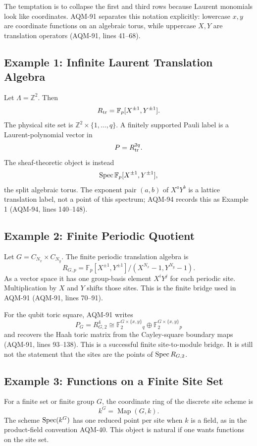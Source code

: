 The temptation is to collapse the first and third rows because Laurent
monomials look like coordinates.  AQM-91 separates this notation explicitly:
lowercase \(x,y\) are coordinate functions on an algebraic torus, while
uppercase \(X,Y\) are translation operators (AQM-91, lines 41--68).

\subsection{Example 1: Infinite Laurent Translation Algebra}

Let \(\Lambda=\mathbb Z^2\).  Then
\[
  R_{\rm tr}=\mathbb F_p[X^{\pm1},Y^{\pm1}].
\]
The physical site set is \(\mathbb Z^2\times\{1,\ldots,q\}\).  A finitely
supported Pauli label is a Laurent-polynomial vector in
\[
  P=R_{\rm tr}^{2q}.
\]
The sheaf-theoretic object is instead
\[
  \operatorname{Spec}\mathbb F_p[X^{\pm1},Y^{\pm1}],
\]
the split algebraic torus.  The exponent pair \((a,b)\) of \(X^aY^b\) is a
lattice translation label, not a point of this spectrum; AQM-94 records this
as Example 1 (AQM-94, lines 140--148).

\subsection{Example 2: Finite Periodic Quotient}

Let \(G=C_{N_x}\times C_{N_y}\).  The finite periodic translation algebra is
\[
  R_{G,p}
  =
  \mathbb F_p[X^{\pm1},Y^{\pm1}]
  /(X^{N_x}-1,Y^{N_y}-1).
\]
As a vector space it has one group-basis element \(X^iY^j\) for each periodic
site.  Multiplication by \(X\) and \(Y\) shifts those sites.  This is the
finite bridge used in AQM-91 (AQM-91, lines 70--91).

For the qubit toric square, AQM-91 writes
\[
  P_G=R_{G,2}^4
  \cong
  \mathbb F_2^{G\times\{x,y\}}{}_q
  \oplus
  \mathbb F_2^{G\times\{x,y\}}{}_p
\]
and recovers the Haah toric matrix from the Cayley-square boundary maps
(AQM-91, lines 93--138).  This is a successful finite site-to-module bridge.
It is still not the statement that the sites are the points of
\(\operatorname{Spec} R_{G,2}\).

\subsection{Example 3: Functions on a Finite Site Set}

For a finite set or finite group \(G\), the coordinate ring of the discrete
site scheme is
\[
  k^G=\operatorname{Map}(G,k).
\]
The scheme \(\operatorname{Spec}(k^G)\) has one reduced point per site when \(k\) is a
field, as in the product-field convention AQM-40.  This object is natural if
one wants functions on the site set.


